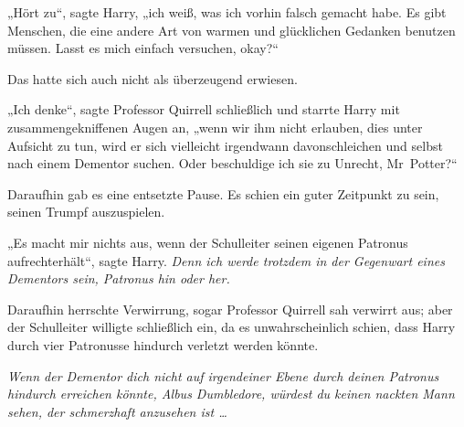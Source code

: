 „Hört zu“, sagte Harry, „ich weiß, was ich vorhin falsch gemacht habe. Es gibt Menschen, die eine andere Art von warmen und glücklichen Gedanken benutzen müssen. Lasst es mich einfach versuchen, okay?“

Das hatte sich auch nicht als überzeugend erwiesen.

„Ich denke“, sagte Professor Quirrell schließlich und starrte Harry mit zusammengekniffenen Augen an, „wenn wir ihm nicht erlauben, dies unter Aufsicht zu tun, wird er sich vielleicht irgendwann davonschleichen und selbst nach einem Dementor suchen. Oder beschuldige ich sie zu Unrecht, Mr~Potter?“

Daraufhin gab es eine entsetzte Pause. Es schien ein guter Zeitpunkt zu sein, seinen Trumpf auszuspielen.

„Es macht mir nichts aus, wenn der Schulleiter seinen eigenen Patronus aufrechterhält“, sagte Harry. \emph{Denn ich werde trotzdem in der Gegenwart eines Dementors sein, Patronus hin oder her.}

Daraufhin herrschte Verwirrung, sogar Professor Quirrell sah verwirrt aus; aber der Schulleiter willigte schließlich ein, da es unwahrscheinlich schien, dass Harry durch vier Patronusse hindurch verletzt werden könnte.

\emph{Wenn der Dementor dich nicht auf irgendeiner Ebene durch deinen Patronus hindurch erreichen könnte, Albus Dumbledore, würdest du keinen nackten Mann sehen, der schmerzhaft anzusehen ist …}


